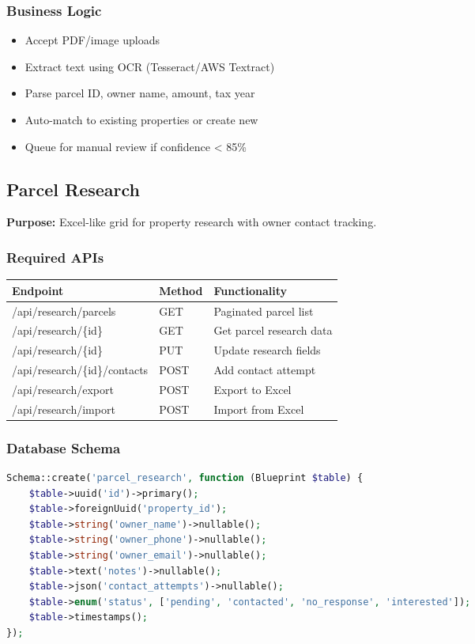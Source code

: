 \documentclass[11pt,a4paper]{article}
\begin{document}
\subsubsection{Business Logic}
\begin{itemize}
    \item Accept PDF/image uploads
    \item Extract text using OCR (Tesseract/AWS Textract)
    \item Parse parcel ID, owner name, amount, tax year
    \item Auto-match to existing properties or create new
    \item Queue for manual review if confidence < 85\%
\end{itemize}

\subsection{Parcel Research}

\textbf{Purpose:} Excel-like grid for property research with owner contact tracking.

\subsubsection{Required APIs}

\begin{longtable}{|p{5cm}|p{2cm}|p{6cm}|}
\hline
\textbf{Endpoint} & \textbf{Method} & \textbf{Functionality} \\
\hline
/api/research/parcels & GET & Paginated parcel list \\
/api/research/\{id\} & GET & Get parcel research data \\
/api/research/\{id\} & PUT & Update research fields \\
/api/research/\{id\}/contacts & POST & Add contact attempt \\
/api/research/export & POST & Export to Excel \\
/api/research/import & POST & Import from Excel \\
\hline
\end{longtable}

\subsubsection{Database Schema}
\begin{lstlisting}[language=php]
Schema::create('parcel_research', function (Blueprint $table) {
    $table->uuid('id')->primary();
    $table->foreignUuid('property_id');
    $table->string('owner_name')->nullable();
    $table->string('owner_phone')->nullable();
    $table->string('owner_email')->nullable();
    $table->text('notes')->nullable();
    $table->json('contact_attempts')->nullable();
    $table->enum('status', ['pending', 'contacted', 'no_response', 'interested']);
    $table->timestamps();
});
\end{lstlisting}
\end{document}

